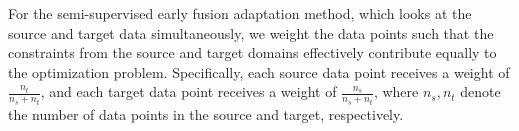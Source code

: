 






  For the semi-supervised early fusion adaptation method, which looks at the source and target data
  simultaneously, we weight 
  the data points such that the constraints from the source and target domains
 effectively contribute equally to the optimization problem.  Specifically,
  each source data point receives a weight of $\frac{n_t}{n_s+n_t}$, and each target
  data point receives a weight of $\frac{n_s}{n_s+n_t}$, where $n_s,n_t$ denote the
  number of data points in the source and target, respectively.
  
